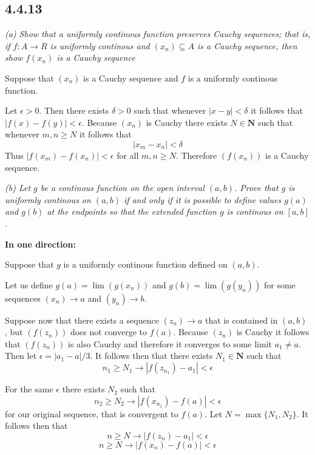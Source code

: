 \documentclass[11pt,oneside,titlepage]{book}
\begin{document}
\subsection*{4.4.13}

\textit{(a) Show that a uniformly continous function preserves Cauchy
  sequences; that is, if $f: A \to R$ is uniformly continous and
  $(x_n) \subseteq A$ is a Cauchy sequence, then show $f(x_n)$ is a
  Cauchy sequence}

Suppose that $(x_n)$ is a Cauchy sequence and $f$ is a uniformly continous function.

Let $\epsilon > 0$. Then there exists $\delta > 0$ such that whenever
$|x - y| < \delta$ it follows that $|f(x) - f(y)| < \epsilon$.
Because $(x_n)$ is Cauchy there exists 
 $N \in \textbf{N}$ such that whenever
$m,n \geq N$ it follows that
$$|x_m - x_n| < \delta$$
Thus $|f(x_m) - f(x_n)| < \epsilon$ for all $m, n \geq N$. Therefore
$(f(x_n))$ is a Cauchy sequence.

\textit{(b) Let $g$ be a continous function on the open interval $(a, b)$.
  Prove that $g$ is uniformly continous on $(a, b)$ if and only if it is
  possible to define values $g(a)$ and $g(b)$ at the endpoints so that the
  extended function $g$ is continous on $[a, b]$.}

\textbf{In one direction: }

Suppose that $g$ is a uniformly continous function defined on $(a, b)$.

Let us define $g(a) = \lim(g(x_n))$ and $g(b) = \lim(g(y_n))$
for some sequences $(x_n) \to a$ and $(y_n) \to b$.


Suppose now that there exists a sequence $(z_n) \to a$ that is contained in
$(a, b)$ , but
$(f(z_n))$ does not converge to $f(a)$. Because $(z_n)$ is Cauchy it follows
that $(f(z_n))$ is also Cauchy and therefore it converges to some limit
$a_1 \neq a$. Then let $\epsilon = |a_1 - a| / 3$. It follows then that
there exists $N_1 \in \textbf{N}$ such that
$$n_1 \geq N_1 \to |f(z_{n_1}) - a_1| < \epsilon$$

For the same $\epsilon$ there exists $N_2$ such that 
$$n_2 \geq N_2 \to |f(x_{n_1}) - f(a)| < \epsilon$$
for our original sequence, that is convergent to $f(a)$.
Let $N = \max\{N_1, N_2\}$. It follows then that
$$n \geq N \to |f(z_n) - a_1| < \epsilon$$
$$n \geq N \to |f(x_n) - f(a)| < \epsilon$$
\end{document}
